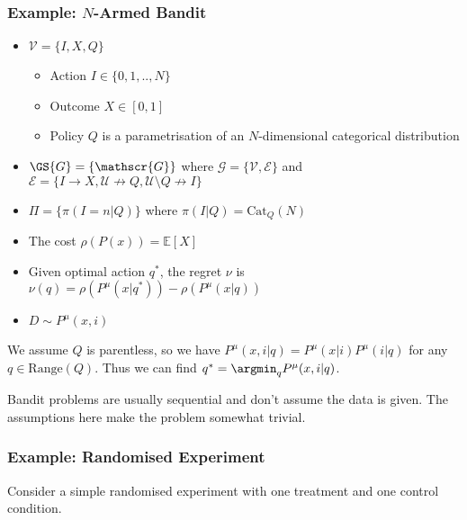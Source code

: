 \subsubsection{Example: $N$-Armed Bandit}\label{sssec:n_armed_bandit}

\begin{itemize}
    \item $\mathcal{V}=\{I,X,Q\}$
    \begin{itemize}
        \item Action $I\in\{0,1,..,N\}$
        \item Outcome $X\in[0,1]$
        \item Policy $Q$ is a parametrisation of an $N$-dimensional categorical distribution
\end{itemize}
    \item $\GS{G}=\{\mathscr{G}\}$ where $\mathscr{G}=\{\mathcal{V},\mathscr{E}\}$ and $\mathscr{E}=\{I\to X, \mathcal{U}\not\to Q,\mathcal{U}\setminus Q\not\to I\}$
    \item $\Pi=\{\pi(I=n|Q)\}$ where $\pi(I|Q)=\text{Cat}_Q(N)$
    \item The cost $\rho(P(x)) = \mathbb{E}[X]$
    \item Given optimal action $q^*$, the regret $\nu$ is $\nu(q)=\rho(P^\mu (x|q^*)) - \rho(P^\mu(x|q))$
    \item $D\sim P^\mu(x,i)$
\end{itemize}

We assume $Q$ is parentless, so we have $P^\mu(x,i|q) = P^\mu(x|i)P^\mu(i|q)$ for any $q\in \text{Range}(Q)$. Thus we can find $q^*=\argmin_q P^\mu(x,i|q)$.

Bandit problems are usually sequential and don't assume the data is given. The assumptions here make the problem somewhat trivial.


\subsubsection{Example: Randomised Experiment}\label{ssssec:randomised_expt}

Consider a simple randomised experiment with one treatment and one control condition.

